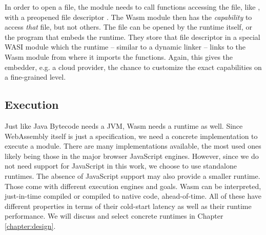 In order to open a file, the module needs to call functions accessing the file, like , with a preopened file descriptor \cite{Clark2019}. The Wasm module then has the \emph{capability} to access \emph{that} file, but not others. The file can be opened by the runtime itself, or the program that embeds the runtime. They store that file descriptor in a special WASI module which the runtime -- similar to a dynamic linker -- links to the Wasm module from where it imports the functions. Again, this gives the embedder, e.g. a cloud provider, the chance to customize the exact capabilities on a fine-grained level.

\subsection{Execution}

Just like Java Bytecode needs a JVM, Wasm needs a runtime as well. Since WebAssembly itself is just a specification, we need a concrete implementation to execute a module. There are many implementations available, the most used ones likely being those in the major browser JavaScript engines. However, since we do not need support for JavaScript in this work, we choose to use standalone runtimes. The absence of JavaScript support may also provide a smaller runtime. Those come with different execution engines and goals. Wasm can be interpreted, just-in-time compiled or compiled to native code, ahead-of-time. All of these have different properties in terms of their cold-start latency as well as their runtime performance. We will discuss and select concrete runtimes in Chapter \ref{chapter:design}.

